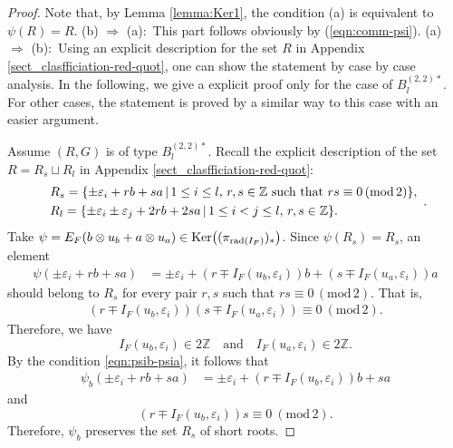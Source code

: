 \documentclass[11pt]{amsart}
\begin{document}
{\begin{proof}
Note that, by Lemma \ref{lemma:Ker1},  the condition (a) is equivalent to $\psi(R)=R$.
\vskip 1mm
\noindent
(b) $\Rightarrow$ (a):\, This part follows obviously by (\ref{eqn:comm-psi}).
\vskip 1mm
\noindent
(a) $\Rightarrow$ (b):\,  Using an explicit description for the set $R$ in Appendix 
\ref{sect_clasfficiation-red-quot},
one can show the statement by case by case analysis. In the following, we give a 
explicit proof only for the case of $B_l^{(2,2)\ast}$. For other cases, the statement
is  proved by a similar way to this case with an easier argument. 

Assume $(R,G)$ is of type $B_l^{(2,2)\ast}$. Recall the explicit description
of the set $R=R_s\sqcup R_l$ in Appendix \ref{sect_clasfficiation-red-quot}:
\begin{equation}\label{eqn:R-B_l^{(2,2)star}}
\begin{array}{ll}
R_s=\{\pm \varepsilon_i+rb+sa\,|\, 1\leq i\leq l,\, r,s\in\mathbb{Z}
\mbox{ such that }rs\equiv 0\,(\mathrm{mod}\,2)\},\\[3pt]
R_l=\{\pm\varepsilon_i\pm\varepsilon_j+2rb+2sa\,|\,1\leq i<j\leq l,\, r,s\in\mathbb{Z}\}.
\end{array}.
\end{equation}
Take $\psi=E_F(b\otimes u_b+a\otimes u_a)\in 
\mbox{\rm Ker}\bigl((\pi_{\mathrm{rad}(I_F)})_*\bigr)$. Since $\psi(R_s)=R_s$, 
an element
\begin{align*}
\psi(\pm \varepsilon_i+rb+sa)&=
\pm\varepsilon_i+(r\mp I_F(u_b,\varepsilon_i))b+(s\mp I_F(u_a,\varepsilon_i))a
\end{align*} 
should belong to $R_s$ for every pair $r,s$ such that
$rs\equiv 0\, (\mathrm{mod}\, 2)$. That is,
\begin{align*}
(r\mp I_F(u_b,\varepsilon_i))(s\mp I_F(u_a,\varepsilon_i))\equiv 0\ (\mathrm{mod}\, 2)
.
\end{align*} 
Therefore, we have
\begin{equation}\label{eqn:psib-psia}
I_F(u_b,\varepsilon_i)\in 2\mathbb{Z}\quad \mbox{and}\quad I_F(u_a,\varepsilon_i)
\in 2\mathbb{Z}.
\end{equation}
By the condition \eqref{eqn:psib-psia}, it follows that
\begin{align*}
\psi_b(\pm \varepsilon_i+rb+sa)&=
\pm\varepsilon_i+(r\mp I_F(u_b,\varepsilon_i))b+sa
\end{align*} 
and 
\[(r\mp I_F(u_b,\varepsilon_i))s\equiv 0\ (\mathrm{mod}\, 2).\]
Therefore, $\psi_b$ preserves the set $R_s$ of short roots. 
 

\end{proof}}
\end{document}

